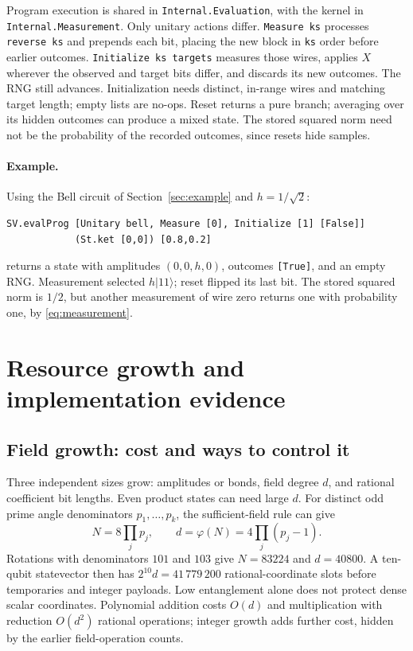 \documentclass[11pt,a4paper]{article}
\newcommand{\code}[1]{\texttt{#1}}
\newcommand{\ket}[1]{|#1\rangle}
\begin{document}
Program execution is shared in \code{Internal.Evaluation}, with the kernel
in \code{Internal.Measurement}. Only unitary actions differ.
\code{Measure ks} processes \code{reverse ks} and prepends each bit,
placing the new block in \code{ks} order before earlier outcomes.
\code{Initialize ks targets} measures those wires, applies $X$ wherever
the observed and target bits differ, and discards its new outcomes.
The RNG still advances. Initialization needs distinct, in-range wires and
matching target length; empty lists are no-ops. Reset returns a pure branch;
averaging over its hidden outcomes can produce a mixed state.
The stored squared norm need not be the probability of the recorded outcomes,
since resets hide samples.

\paragraph{Example.}
Using the Bell circuit of Section~\ref{sec:example} and $h=1/\sqrt2$:
\begin{lstlisting}
SV.evalProg [Unitary bell, Measure [0], Initialize [1] [False]]
            (St.ket [0,0]) [0.8,0.2]
\end{lstlisting}
returns a state with amplitudes $(0,0,h,0)$, outcomes \code{[True]}, and
an empty RNG. Measurement selected $h\ket{11}$; reset flipped its last bit.
The stored squared norm is $1/2$, but another measurement of wire zero
returns one with probability one, by \eqref{eq:measurement}.

\section{Resource growth and implementation evidence}
\subsection{Field growth: cost and ways to control it}
\label{sec:growth}
Three independent sizes grow: amplitudes or bonds, field degree $d$,
and rational coefficient bit lengths. Even product states can need large $d$.
For distinct odd prime angle denominators $p_1,\ldots,p_k$, the
sufficient-field rule can give
\[
N=8\prod_jp_j,\qquad d=\varphi(N)=4\prod_j(p_j-1).
\]
Rotations with denominators $101$ and $103$ give $N=83224$ and $d=40800$.
A ten-qubit statevector then has $2^{10}d=41\,779\,200$ rational-coordinate
slots before temporaries and integer payloads. Low entanglement alone
does not protect dense scalar coordinates. Polynomial addition costs
$O(d)$ and multiplication with reduction $O(d^2)$ rational operations;
integer growth adds further cost, hidden by the earlier field-operation counts.
\end{document}
